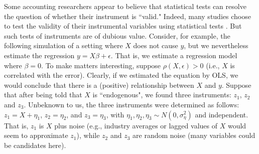 \documentclass[12pt,reqno,titlepage]{amsart}
\theoremstyle{definition}
\begin{document}
\begin{doublespace}
Some accounting researchers appear to believe that statistical tests can resolve the question of whether their instrument is ``valid."
Indeed, many studies choose to test the validity of their instrumental variables using statistical tests \citep[see][]{Larcker:2010fq}.
%
%
But such tests of instruments are of dubious value. 
Consider, for example, the following simulation of a setting where $X$ does not cause $y$, but we nevertheless estimate the regression $y = X \beta + \epsilon$. That is, we estimate a regression model
where $\beta = 0$. To make matters interesting, suppose $\rho(X, \epsilon) > 0$ (i.e., $X$ is correlated with the error). Clearly, if we estimated the equation by OLS, we would
conclude that there is a (positive) relationship between $X$ and $y$. Suppose that after being told that $X$ is ``endogenous", we found
three instruments: $z_1$, $z_2$ and $z_3$. Unbeknown to us, the three instruments were determined as follows:
$z_1 = X +\eta_1$, $z_2 = \eta_2$, and $z_3 = \eta_3$, with $\eta_1, \eta_2,  \eta_3 \sim N(0, \sigma_{\eta}^2)$ and independent. 
That is, $z_1$ is $X$ plus noise (e.g., industry averages or lagged values of $X$ would seem to approximate $z_1$), while $z_2$ and $z_3$ are random noise (many variables could be candidates here).


\end{doublespace}
\end{document}
